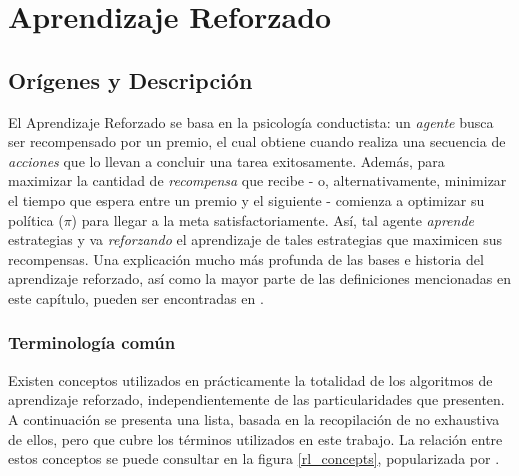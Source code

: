 \chapter{Aprendizaje Reforzado}

\section{Or\'igenes y Descripci\'on}

El Aprendizaje Reforzado se basa en la psicolog\'ia conductista: un \textit{agente} busca ser recompensado por un premio, el cual obtiene cuando realiza una secuencia de \textit{acciones} que lo llevan a concluir una tarea exitosamente. Adem\'as, para maximizar la cantidad de \textit{recompensa} que recibe - o, alternativamente, minimizar el tiempo que espera entre un premio y el siguiente - comienza a optimizar su pol\'itica (\textit{$\pi$}) para llegar a la meta satisfactoriamente. As\'i, tal agente \textit{aprende} estrategias y va \textit{reforzando} el aprendizaje de tales estrategias que maximicen sus recompensas. Una explicaci\'on mucho m\'as profunda de las bases e historia del aprendizaje reforzado, as\'i como la mayor parte de las definiciones mencionadas en este cap\'itulo, pueden ser encontradas en \citet{Sutton}.\\

\subsection{Terminolog\'ia com\'un}

Existen conceptos utilizados en pr\'acticamente la totalidad de los algoritmos de aprendizaje reforzado, independientemente de las particularidades que presenten. A continuaci\'on se presenta una lista, basada en la recopilaci\'on de \citet{rlexplained} no exhaustiva de ellos, pero que cubre los t\'erminos utilizados en este trabajo. La relaci\'on entre estos conceptos se puede consultar en la figura \ref{rl_concepts}, popularizada por \cite{Sutton}.

